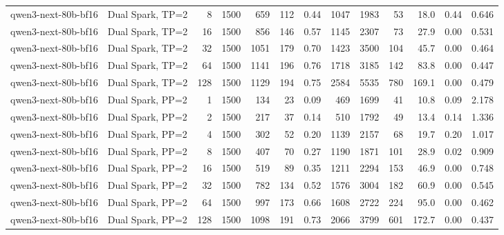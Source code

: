 \begin{tabular}{l l r r r r r r r r r r r}
qwen3-next-80b-bf16 & Dual Spark, TP=2 & 8 & 1500 & 659 & 112 & 0.44 & 1047 & 1983 & 53 & 18.0 & 0.44 & 0.646 \\
qwen3-next-80b-bf16 & Dual Spark, TP=2 & 16 & 1500 & 856 & 146 & 0.57 & 1145 & 2307 & 73 & 27.9 & 0.00 & 0.531 \\
qwen3-next-80b-bf16 & Dual Spark, TP=2 & 32 & 1500 & 1051 & 179 & 0.70 & 1423 & 3500 & 104 & 45.7 & 0.00 & 0.464 \\
qwen3-next-80b-bf16 & Dual Spark, TP=2 & 64 & 1500 & 1141 & 196 & 0.76 & 1718 & 3185 & 142 & 83.8 & 0.00 & 0.447 \\
qwen3-next-80b-bf16 & Dual Spark, TP=2 & 128 & 1500 & 1129 & 194 & 0.75 & 2584 & 5535 & 780 & 169.1 & 0.00 & 0.479 \\
\addlinespace
qwen3-next-80b-bf16 & Dual Spark, PP=2 & 1 & 1500 & 134 & 23 & 0.09 & 469 & 1699 & 41 & 10.8 & 0.09 & 2.178 \\
qwen3-next-80b-bf16 & Dual Spark, PP=2 & 2 & 1500 & 217 & 37 & 0.14 & 510 & 1792 & 49 & 13.4 & 0.14 & 1.336 \\
qwen3-next-80b-bf16 & Dual Spark, PP=2 & 4 & 1500 & 302 & 52 & 0.20 & 1139 & 2157 & 68 & 19.7 & 0.20 & 1.017 \\
qwen3-next-80b-bf16 & Dual Spark, PP=2 & 8 & 1500 & 407 & 70 & 0.27 & 1190 & 1871 & 101 & 28.9 & 0.02 & 0.909 \\
qwen3-next-80b-bf16 & Dual Spark, PP=2 & 16 & 1500 & 519 & 89 & 0.35 & 1211 & 2294 & 153 & 46.9 & 0.00 & 0.748 \\
qwen3-next-80b-bf16 & Dual Spark, PP=2 & 32 & 1500 & 782 & 134 & 0.52 & 1576 & 3004 & 182 & 60.9 & 0.00 & 0.545 \\
qwen3-next-80b-bf16 & Dual Spark, PP=2 & 64 & 1500 & 997 & 173 & 0.66 & 1608 & 2722 & 224 & 95.0 & 0.00 & 0.462 \\
qwen3-next-80b-bf16 & Dual Spark, PP=2 & 128 & 1500 & 1098 & 191 & 0.73 & 2066 & 3799 & 601 & 172.7 & 0.00 & 0.437 \\
\bottomrule
\end{tabular}
